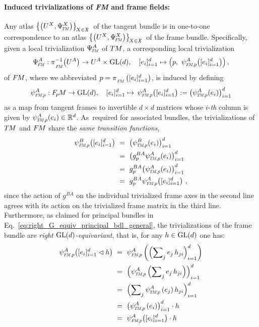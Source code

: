 \paragraph{Induced trivializations of \textit{FM} and frame fields:}

Any atlas
$\big\{ \big(U^X, \PsiTM^X \big) \big\}_{\!X\in\mathfrak{X}}\,$
of the tangent bundle is in one-to-one correspondence to an atlas
$\big\{ \big(U^X, \PsiFM^X \big) \big\}_{\!X\in\mathfrak{X}}\,$
of the frame bundle.
Specifically, given a local trivialization $\PsiTM^A$ of $T\mkern-1.5muM$, a corresponding local trivialization
\begin{align}\label{eq:trivialization_FM}
    \PsiFM^A: \piFM^{-1}\big(U^A\big)\to U^A\times \GL{d}, \quad
    [e_{i}]_{i=1}^d \mapsto \pig(p,\ \psiFMp^A\big([e_{i}]_{i=1}^d\big) \pig) \,,
\end{align}
of $F\mkern-1.5muM$, where we abbreviated $p=\piFM\left( [e_{i}]_{i=1}^d\right)$, is induced by defining
\begin{align}\label{eq:trivialization_FM_p}
    \psiFMp^A: \FpM\to \GL{d}, \quad
    [e_{i}]_{i=1}^d \mapsto\, \psiFMp^A \big([e_{i}]_{i=1}^d\big) := \big(\psiTMp^A(e_{i})\big)_{i=1}^d
\end{align}
as a map from tangent frames to invertible $d\!\times\!d$ matrices whose $i$-\emph{th} column is given by $\psiTMp^A(e_{i})\in\R^d$.
As~required for associated bundles, the trivializations of $T\mkern-1.5muM$ and $F\mkern-1.5muM$ share the \emph{same transition functions},
\begin{align}\label{eq:transition_functions_FM}
    \psiFMp^B\big([e_{i}]_{i=1}^d\big)
    \ &=\ \big(\psiTMp^B(e_{i}) \big)_{i=1}^d \notag \\
    \ &=\ \big(g_p^{BA} \psiTMp^A(e_{i}) \big)_{i=1}^d \notag \\
    \ &=\ g_p^{BA} \big(\psiTMp^A(e_{i}) \big)_{i=1}^d \notag \\
    \ &=\ g_p^{BA} \psiFMp^A\big([e_{i}]_{i=1}^d \big) \ ,
\end{align}
since the action of $g^{BA}$ on the individual trivialized frame axes in the second line agrees with its action on the trivialized frame matrix in the third line.
Furthermore, as claimed for principal bundles in Eq.~\eqref{eq:right_G_equiv_principal_bdl_general}, the trivializations of the frame bundle are \emph{right $\operatorname{GL}(d)$-equivariant}, that is, for any $h\in \operatorname{GL}(d)$ one has:
\begin{align}\label{eq:right_equivariance_FM}
    \psiFMp^A\big([e_{i}]_{i=1}^d \lhd h\big)
    \ &=\ \psiFMp^A\left(\left(\sum\nolimits_j e_{j}\, h_{ji} \right)_{i=1}^d\right) \notag \\
    \ &=\ \left(\psiTMp^A\left(\sum\nolimits_j e_{j}\, h_{ji} \right)\right)_{i=1}^d \notag \\
    \ &=\ \left(\sum\nolimits_j \psiTMp^A\left(e_{j}\right) h_{ji} \right)_{i=1}^d \notag \\
    \ &=\ \left( \psiTMp^A\left(e_{i}\right) \right)_{i=1}^d  \cdot h \notag \\
    \ &=\ \psiFMp^A\big( [e_{i}]_{i=1}^d \big) \cdot h
\end{align}
